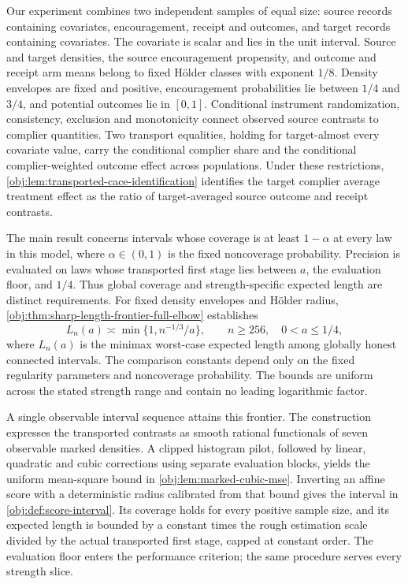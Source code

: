 Our experiment combines two independent samples of equal size: source records containing covariates, encouragement, receipt and outcomes, and target records containing covariates. The covariate is scalar and lies in the unit interval. Source and target densities, the source encouragement propensity, and outcome and receipt arm means belong to fixed Hölder classes with exponent \(1/8\). Density envelopes are fixed and positive, encouragement probabilities lie between \(1/4\) and \(3/4\), and potential outcomes lie in \([0,1]\). Conditional instrument randomization, consistency, exclusion and monotonicity connect observed source contrasts to complier quantities. Two transport equalities, holding for target-almost every covariate value, carry the conditional complier share and the conditional complier-weighted outcome effect across populations. Under these restrictions, \cref{obj:lem:transported-cace-identification} identifies the target complier average treatment effect as the ratio of target-averaged source outcome and receipt contrasts.

The main result concerns intervals whose coverage is at least \(1-\alpha\) at every law in this model, where \(\alpha\in(0,1)\) is the fixed noncoverage probability. Precision is evaluated on laws whose transported first stage lies between \(a\), the evaluation floor, and \(1/4\). Thus global coverage and strength-specific expected length are distinct requirements. For fixed density envelopes and Hölder radius, \cref{obj:thm:sharp-length-frontier-full-elbow} establishes
\[
L_n(a)\asymp \min\{1,n^{-1/3}/a\},
\qquad n\ge256,\quad 0<a\le1/4,
\]
where \(L_n(a)\) is the minimax worst-case expected length among globally honest connected intervals. The comparison constants depend only on the fixed regularity parameters and noncoverage probability. The bounds are uniform across the stated strength range and contain no leading logarithmic factor.

A single observable interval sequence attains this frontier. The construction expresses the transported contrasts as smooth rational functionals of seven observable marked densities. A clipped histogram pilot, followed by linear, quadratic and cubic corrections using separate evaluation blocks, yields the uniform mean-square bound in \cref{obj:lem:marked-cubic-mse}. Inverting an affine score with a deterministic radius calibrated from that bound gives the interval in \cref{obj:def:score-interval}. Its coverage holds for every positive sample size, and its expected length is bounded by a constant times the rough estimation scale divided by the actual transported first stage, capped at constant order. The evaluation floor enters the performance criterion; the same procedure serves every strength slice.

